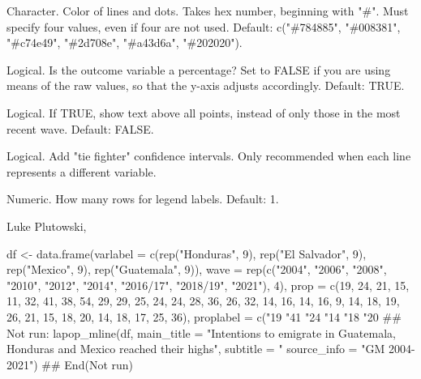 \documentclass[a4paper]{book}
\begin{document}
\begin{Arguments}
\begin{ldescription}
\item[\code{color\_scheme}] Character.  Color of lines and dots.  Takes hex number, beginning with "\#".
Must specify four values, even if four are not used.
Default: c("\#784885", "\#008381", "\#c74e49", "\#2d708e", "\#a43d6a", "\#202020").

\item[\code{percentages}] Logical.  Is the outcome variable a percentage?  Set to FALSE if you are using
means of the raw values, so that the y-axis adjusts accordingly. Default: TRUE.

\item[\code{all\_labels}] Logical.  If TRUE, show text above all points, instead of only those in the most recent wave. Default: FALSE.

\item[\code{ci}] Logical.  Add "tie fighter" confidence intervals.  Only recommended when each line represents a different variable.

\item[\code{legendnrow}] Numeric.  How many rows for legend labels. Default: 1.
\end{ldescription}
\end{Arguments}
%
\begin{Author}
Luke Plutowski, 
\end{Author}
%
\begin{Examples}
\begin{ExampleCode}
df <- data.frame(varlabel = c(rep("Honduras", 9), rep("El Salvador", 9),
                             rep("Mexico", 9), rep("Guatemala", 9)),
                wave = rep(c("2004", "2006", "2008", "2010", "2012",
                             "2014", "2016/17", "2018/19", "2021"), 4),
                prop = c(19, 24, 21, 15, 11, 32, 41, 38, 54, 29, 29, 25,
                         24, 24, 28, 36, 26, 32, 14, 16, 14, 16, 9, 14,
                         18, 19, 26, 21, 15, 18, 20, 14, 18, 17, 25, 36),
                proplabel = c("19%
                              "41%
                              "24%
                              "14%
                              "18%
                              "20%
## Not run: 
lapop_mline(df,
     main_title = "Intentions to emigrate in Guatemala, Honduras and Mexico reached their highs",
     subtitle = "%
     source_info = "GM 2004-2021")
## End(Not run)

\end{ExampleCode}
\end{Examples}
\end{document}
